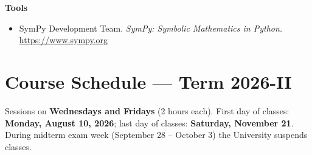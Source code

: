 \documentclass[11pt]{article}
\begin{document}
\textbf{Tools}
\begin{itemize}
\item SymPy Development Team. \emph{SymPy: Symbolic Mathematics in Python.} \url{https://www.sympy.org}
\end{itemize}

\section{Course Schedule --- Term 2026-II}

Sessions on \textbf{Wednesdays and Fridays} (2 hours each). First day of classes: \textbf{Monday, August 10, 2026}; last day of classes: \textbf{Saturday, November 21}. During midterm exam week (September 28 -- October 3) the University suspends classes.
\end{document}
